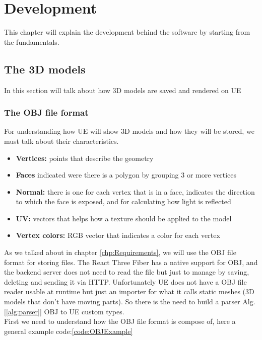 
\chapter{Development}
\label{chp:project}
\noindent
This chapter will explain the development behind the software by starting from the fundamentals.
\section{The 3D models}
\noindent
In this section will talk about how 3D models are saved and rendered on \ac{UE}
\subsection{The OBJ file format}
\noindent
For understanding how \ac{UE} will show 3D models and how they will be stored, we must talk about their characteristics.

\begin{itemize}
    \item \textbf{Vertices:} points that describe the geometry
    \item \textbf{Faces} indicated were there is a polygon by grouping 3 or more vertices 
    \item \textbf{Normal:} there is one for each vertex that is in a face, indicates the direction to which the face is exposed, and for calculating how light is reflected
    \item \textbf{UV:} vectors that helps how a texture should be applied to the model
    \item \textbf{Vertex colors:} RGB vector that indicates a color for each vertex
\end{itemize}
\noindent
As we talked about in chapter \ref{chp:Requirements}, we will use the OBJ file format for storing files.
The React Three Fiber has a native support for OBJ, and the backend server does not need to read the file but just to manage by saving, deleting and sending it via \ac{HTTP}.
Unfortunately \ac{UE} does not have a OBJ file reader usable at runtime but just an importer for what it calls static meshes (3D models that don't have moving parts).
So there is the need to build a parser Alg.[\ref{alg:parser}] OBJ to \ac{UE} custom types.\\
First we need to understand how the OBJ file format is compose of, here a general example code:\ref{code:OBJExample}

